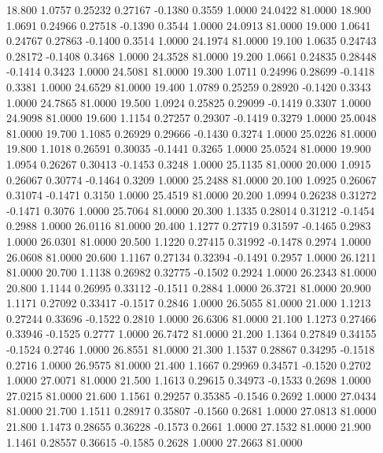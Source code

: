   18.800   1.0757   0.25232   0.27167  -0.1380   0.3559   1.0000  24.0422  81.0000
  18.900   1.0691   0.24966   0.27518  -0.1390   0.3544   1.0000  24.0913  81.0000
  19.000   1.0641   0.24767   0.27863  -0.1400   0.3514   1.0000  24.1974  81.0000
  19.100   1.0635   0.24743   0.28172  -0.1408   0.3468   1.0000  24.3528  81.0000
  19.200   1.0661   0.24835   0.28448  -0.1414   0.3423   1.0000  24.5081  81.0000
  19.300   1.0711   0.24996   0.28699  -0.1418   0.3381   1.0000  24.6529  81.0000
  19.400   1.0789   0.25259   0.28920  -0.1420   0.3343   1.0000  24.7865  81.0000
  19.500   1.0924   0.25825   0.29099  -0.1419   0.3307   1.0000  24.9098  81.0000
  19.600   1.1154   0.27257   0.29307  -0.1419   0.3279   1.0000  25.0048  81.0000
  19.700   1.1085   0.26929   0.29666  -0.1430   0.3274   1.0000  25.0226  81.0000
  19.800   1.1018   0.26591   0.30035  -0.1441   0.3265   1.0000  25.0524  81.0000
  19.900   1.0954   0.26267   0.30413  -0.1453   0.3248   1.0000  25.1135  81.0000
  20.000   1.0915   0.26067   0.30774  -0.1464   0.3209   1.0000  25.2488  81.0000
  20.100   1.0925   0.26067   0.31074  -0.1471   0.3150   1.0000  25.4519  81.0000
  20.200   1.0994   0.26238   0.31272  -0.1471   0.3076   1.0000  25.7064  81.0000
  20.300   1.1335   0.28014   0.31212  -0.1454   0.2988   1.0000  26.0116  81.0000
  20.400   1.1277   0.27719   0.31597  -0.1465   0.2983   1.0000  26.0301  81.0000
  20.500   1.1220   0.27415   0.31992  -0.1478   0.2974   1.0000  26.0608  81.0000
  20.600   1.1167   0.27134   0.32394  -0.1491   0.2957   1.0000  26.1211  81.0000
  20.700   1.1138   0.26982   0.32775  -0.1502   0.2924   1.0000  26.2343  81.0000
  20.800   1.1144   0.26995   0.33112  -0.1511   0.2884   1.0000  26.3721  81.0000
  20.900   1.1171   0.27092   0.33417  -0.1517   0.2846   1.0000  26.5055  81.0000
  21.000   1.1213   0.27244   0.33696  -0.1522   0.2810   1.0000  26.6306  81.0000
  21.100   1.1273   0.27466   0.33946  -0.1525   0.2777   1.0000  26.7472  81.0000
  21.200   1.1364   0.27849   0.34155  -0.1524   0.2746   1.0000  26.8551  81.0000
  21.300   1.1537   0.28867   0.34295  -0.1518   0.2716   1.0000  26.9575  81.0000
  21.400   1.1667   0.29969   0.34571  -0.1520   0.2702   1.0000  27.0071  81.0000
  21.500   1.1613   0.29615   0.34973  -0.1533   0.2698   1.0000  27.0215  81.0000
  21.600   1.1561   0.29257   0.35385  -0.1546   0.2692   1.0000  27.0434  81.0000
  21.700   1.1511   0.28917   0.35807  -0.1560   0.2681   1.0000  27.0813  81.0000
  21.800   1.1473   0.28655   0.36228  -0.1573   0.2661   1.0000  27.1532  81.0000
  21.900   1.1461   0.28557   0.36615  -0.1585   0.2628   1.0000  27.2663  81.0000
